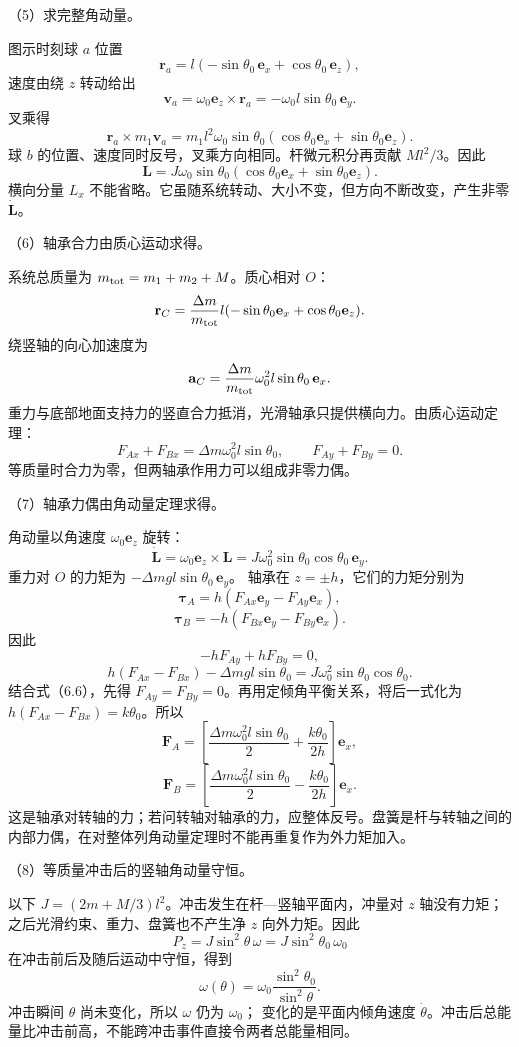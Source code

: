 \documentclass[12pt,a4paper,fontset=fandol]{ctexart}
\begin{document}
（5）求完整角动量。

图示时刻球 \(a\) 位置 \[
\mathbf r_a=l(-\sin\theta_0\,\mathbf e_x+
\cos\theta_0\,\mathbf e_z),
\] 速度由绕 \(z\) 转动给出 \[
\mathbf v_a=\omega_0\mathbf e_z\times\mathbf r_a
=-\omega_0l\sin\theta_0\,\mathbf e_y.
\] 叉乘得 \[
\mathbf r_a\times m_1\mathbf v_a
=m_1l^2\omega_0\sin\theta_0
(\cos\theta_0\mathbf e_x+\sin\theta_0\mathbf e_z).
\] 球 \(b\) 的位置、速度同时反号，叉乘方向相同。杆微元积分再贡献
\(Ml^2/3\)。因此 \[
\boxed{
\mathbf L=J\omega_0\sin\theta_0
(\cos\theta_0\mathbf e_x+\sin\theta_0\mathbf e_z).}\tag{6.5}
\] 横向分量 \(L_x\)
不能省略。它虽随系统转动、大小不变，但方向不断改变，产生非零
\(\dot{\mathbf L}\)。

（6）轴承合力由质心运动求得。

系统总质量为 \(m_{\rm tot}=m_1+m_2+M\)。质心相对 \(O\)： \[
\mathbf r_C=\frac{\Delta m}{m_{\rm tot}}
l(-\sin\theta_0\mathbf e_x+\cos\theta_0\mathbf e_z).
\] 绕竖轴的向心加速度为 \[
\mathbf a_C=
\frac{\Delta m}{m_{\rm tot}}\omega_0^2l\sin\theta_0\,\mathbf e_x.
\]
重力与底部地面支持力的竖直合力抵消，光滑轴承只提供横向力。由质心运动定理：
\[
F_{Ax}+F_{Bx}=\Delta m\omega_0^2l\sin\theta_0,
\qquad F_{Ay}+F_{By}=0.\tag{6.6}
\] 等质量时合力为零，但两轴承作用力可以组成非零力偶。

（7）轴承力偶由角动量定理求得。

角动量以角速度 \(\omega_0\mathbf e_z\) 旋转： \[
\dot{\mathbf L}
=\omega_0\mathbf e_z\times\mathbf L
=J\omega_0^2\sin\theta_0\cos\theta_0\,\mathbf e_y.
\] 重力对 \(O\) 的力矩为 \(-\Delta mgl\sin\theta_0\,\mathbf e_y\)。
轴承在 \(z=\pm h\)，它们的力矩分别为 \[
\boldsymbol\tau_A=h(F_{Ax}\mathbf e_y-F_{Ay}\mathbf e_x),
\] \[
\boldsymbol\tau_B=-h(F_{Bx}\mathbf e_y-F_{By}\mathbf e_x).
\] 因此 \[
-hF_{Ay}+hF_{By}=0,
\] \[
h(F_{Ax}-F_{Bx})-\Delta mgl\sin\theta_0
=J\omega_0^2\sin\theta_0\cos\theta_0.
\] 结合式（6.6），先得
\(F_{Ay}=F_{By}=0\)。再用定倾角平衡关系，将后一式化为
\(h(F_{Ax}-F_{Bx})=k\theta_0\)。所以 \[
\boxed{\mathbf F_A=
\left[\frac{\Delta m\omega_0^2l\sin\theta_0}{2}
+\frac{k\theta_0}{2h}\right]\mathbf e_x,}\tag{6.7}
\] \[
\boxed{\mathbf F_B=
\left[\frac{\Delta m\omega_0^2l\sin\theta_0}{2}
-\frac{k\theta_0}{2h}\right]\mathbf e_x.}\tag{6.8}
\]
这是轴承对转轴的力；若问转轴对轴承的力，应整体反号。盘簧是杆与转轴之间的内部力偶，在对整体列角动量定理时不能再重复作为外力矩加入。

（8）等质量冲击后的竖轴角动量守恒。

以下 \(J=(2m+M/3)l^2\)。冲击发生在杆---竖轴平面内，冲量对 \(z\)
轴没有力矩；之后光滑约束、重力、盘簧也不产生净 \(z\) 向外力矩。因此 \[
P_z=J\sin^2\theta\,\omega
=J\sin^2\theta_0\,\omega_0
\] 在冲击前后及随后运动中守恒，得到 \[
\boxed{\omega(\theta)=
\omega_0\frac{\sin^2\theta_0}{\sin^2\theta}.}\tag{6.9}
\] 冲击瞬间 \(\theta\) 尚未变化，所以 \(\omega\) 仍为 \(\omega_0\)；
变化的是平面内倾角速度
\(\dot\theta\)。冲击后总能量比冲击前高，不能跨冲击事件直接令两者总能量相同。
\end{document}
